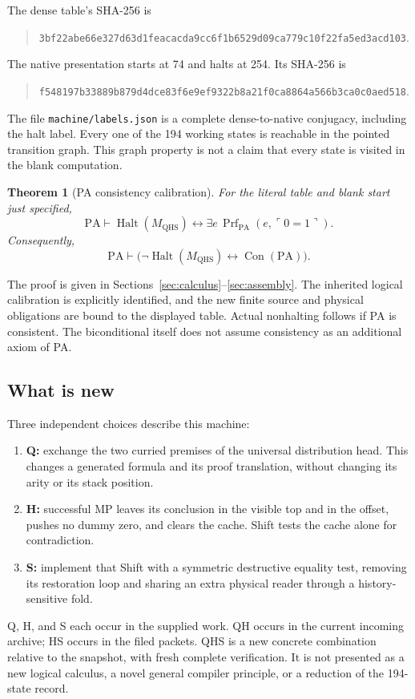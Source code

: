 \documentclass[11pt,letterpaper]{article}
\newcommand{\PA}{\mathrm{PA}}
\newcommand{\Con}{\operatorname{Con}}
\newcommand{\Prf}{\operatorname{Prf}}
\newcommand{\Halt}{\operatorname{Halt}}
\newcommand{\file}[1]{\texttt{\nolinkurl{#1}}}
\newcommand{\QHS}{M_{\mathrm{QHS}}}
\newtheorem{theorem}{Theorem}[section]
\begin{document}
The dense table's SHA-256 is
\begin{quote}\small
\nolinkurl{3bf22abe66e327d63d1feacacda9cc6f1b6529d09ca779c10f22fa5ed3acd103}.
\end{quote}
The native presentation starts at 74 and halts at 254. Its SHA-256 is
\begin{quote}\small
\nolinkurl{f548197b33889b879d4dce83f6e9ef9322b8a21f0ca8864a566b3ca0c0aed518}.
\end{quote}
The file \file{machine/labels.json} is a complete dense-to-native
conjugacy, including the halt label. Every one of the 194 working states
is reachable in the pointed transition graph. This graph property is not
a claim that every state is visited in the blank computation.

\begin{theorem}[PA consistency calibration]\label{thm:main}
For the literal table and blank start just specified,
\[
 \PA\vdash \Halt(\QHS)\leftrightarrow
       \exists e\,\Prf_{\PA}(e,\ulcorner0=1\urcorner).
\]
Consequently,
\[
 \boxed{\PA\vdash
   \bigl(\neg\Halt(\QHS)\leftrightarrow\Con(\PA)\bigr).}
\]
\end{theorem}

The proof is given in Sections~\ref{sec:calculus}--\ref{sec:assembly}.
The inherited logical calibration is explicitly identified, and the new
finite source and physical obligations are bound to the displayed table.
Actual nonhalting follows if PA is consistent. The biconditional itself
does not assume consistency as an additional axiom of PA.

\subsection{What is new}

Three independent choices describe this machine:
\begin{enumerate}
\item \textbf{Q:} exchange the two curried premises of the universal
      distribution head. This changes a generated formula and its proof
      translation, without changing its arity or its stack position.
\item \textbf{H:} successful MP leaves its conclusion in the visible top
      and in the offset, pushes no dummy zero, and clears the cache.
      Shift tests the cache alone for contradiction.
\item \textbf{S:} implement that Shift with a symmetric destructive
      equality test, removing its restoration loop and sharing an extra
      physical reader through a history-sensitive fold.
\end{enumerate}
Q, H, and S each occur in the supplied work. QH occurs in the current
incoming archive; HS occurs in the filed packets. QHS is a new concrete
combination relative to the snapshot, with fresh complete verification.
It is not presented as a new logical calculus, a novel general compiler
principle, or a reduction of the 194-state record.
\end{document}
